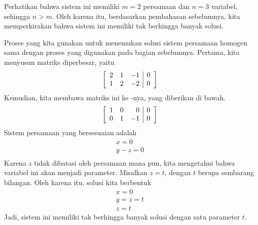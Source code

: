 \begin{solution}
Perhatikan bahwa sistem ini memiliki $m = 2$ persamaan dan $n = 3$ variabel, sehingga $n>m$.
Oleh karena itu, berdasarkan pembahasan sebelumnya, kita memperkirakan bahwa sistem ini memiliki tak berhingga banyak solusi.

Proses yang kita gunakan untuk menemukan solusi sistem persamaan homogen
sama dengan proses yang digunakan pada bagian sebelumnya.
Pertama, kita menyusun matriks diperbesar, yaitu
\begin{equation*}
\left[
\begin{array}{rrr|r}
2 & 1 & -1 & 0 \\ 
1 & 2 & -2 & 0
\end{array}
\right]
\end{equation*}
Kemudian, kita membawa matriks ini ke \rref-nya, yang diberikan di bawah.
\begin{equation*}
\left[
\begin{array}{rrr|r}
1 & 0 & 0 & 0 \\ 
0 & 1 & -1 & 0
\end{array}
\right]
\end{equation*}
Sistem persamaan yang bersesuaian adalah
\begin{equation*}
\begin{array}{c}
x = 0 \\
y - z =0 \\
\end{array}
\end{equation*}
Karena $z$ tidak dibatasi oleh persamaan mana pun, kita mengetahui bahwa variabel ini akan menjadi parameter.
Misalkan $z=t$, dengan $t$ berupa sembarang bilangan.
Oleh karena itu, solusi kita berbentuk
\begin{equation*}
\begin{array}{c}
x = 0 \\
y = z = t \\
z = t
\end{array}
\end{equation*}
Jadi, sistem ini memiliki tak berhingga banyak solusi dengan satu parameter $t$.
\end{solution}

